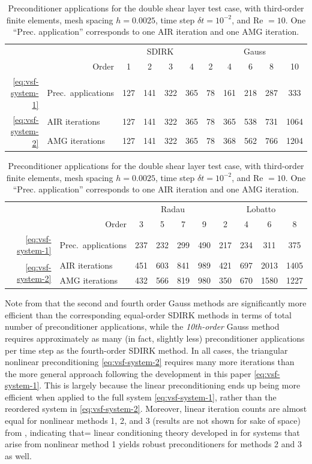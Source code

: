 \documentclass[review]{siamart}
\begin{document}
\begin{table}[h!]
	\centering
	\caption{Preconditioner applications for the double shear layer test case, with third-order
	finite elements, mesh spacing $h=0.0025$, time step $\delta t = 10^{-2}$, and Re $=10$. One
	``Prec. application'' corresponds to one AIR iteration and one AMG iteration.}
	\label{tab:dsl-iters}
	\begin{tabular}{rl|cccc|ccccc}
		\toprule
		&& \multicolumn{4}{c|}{SDIRK} & \multicolumn{5}{c}{Gauss} \\
		& \multicolumn{1}{r|}{Order}  & 1 & 2 & 3 & 4 & 2 & 4 & 6 & 8 & 10\\
		\midrule
		\eqref{eq:vsf-system-1} & Prec.\ applications & 127 & 141 & 322 & 365 & 78 & 161 & 218 & 287 & 333 \\
		\midrule
		\multirow{2}{*}{\eqref{eq:vsf-system-2}} & AIR iterations & 127 & 141 & 322 & 365 & 78 & 365 & 538 & 731 & 1064\\
		& AMG iterations & 127 & 141 & 322 & 365 & 78 & 368 & 562 & 766 & 1204 \\
		\bottomrule
	\end{tabular}

	\vspace{\floatsep}

	\begin{tabular}{rl|cccc|cccc}
		\toprule
		&& \multicolumn{4}{c|}{Radau} & \multicolumn{4}{c}{Lobatto} \\
		& \multicolumn{1}{r|}{Order} & 3 & 5 & 7 & 9 & 2 & 4 & 6 & 8\\
		\midrule
		\eqref{eq:vsf-system-1} & Prec.\ applications & 237 & 232 & 299 & 490 & 217 & 234 & 311 & 375 \\
		\midrule
		\multirow{2}{*}{\eqref{eq:vsf-system-2}} & AIR iterations & 451 & 603 & 841 & 989 & 421 & 697 & 2013 & 1405 \\
		& AMG iterations & 432 & 566 & 819 & 980 & 350 & 670 & 1580 & 1227\\
		\bottomrule
	\end{tabular}
\end{table}

Note from  that the second and fourth order Gauss methods
are significantly more efficient than the corresponding equal-order SDIRK
methods in terms of total number of preconditioner applications, while the
\textit{10th-order} Gauss method requires approximately as many (in fact,
slightly less) preconditioner applications per time step as the fourth-order
SDIRK method. In all cases, the triangular nonlinear preconditioning
\eqref{eq:vsf-system-2} requires many more iterations than the more general
approach following the development in this paper \eqref{eq:vsf-system-1}. This
is largely because the linear preconditioning ends up being more efficient
when applied to the full system \eqref{eq:vsf-system-1}, rather than the
reordered system in \eqref{eq:vsf-system-2}. Moreover, linear iteration
counts are almost equal for nonlinear methods 1, 2, and 3 (results are not
shown for sake of space) from , indicating that=
linear conditioning theory developed in  for systems
that arise from nonlinear method 1 yields robust preconditioners for
methods 2 and 3 as well.
\end{document}
